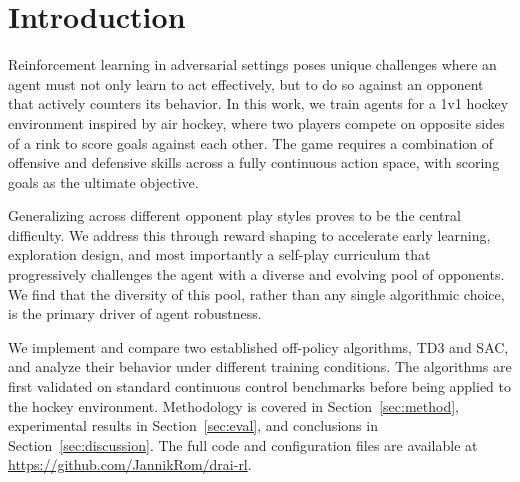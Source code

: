 \section{Introduction}\label{sec:intro}

Reinforcement learning in adversarial settings poses unique challenges where an agent 
must not only learn to act effectively, but to do so against an opponent that actively 
counters its behavior. In this work, we train agents for a 1v1 hockey environment 
inspired by air hockey, where two players compete on opposite sides of a rink to 
score goals against each other. The game requires a combination of offensive and 
defensive skills across a fully continuous action space, with scoring goals as 
the ultimate objective.

\medskip
Generalizing across different opponent play styles proves to be the central difficulty. 
We address this through reward shaping to accelerate early learning, exploration 
design, and most importantly a self-play curriculum that progressively challenges the 
agent with a diverse and evolving pool of opponents. We find that the diversity of 
this pool, rather than any single algorithmic choice, is the primary driver of 
agent robustness.

\medskip
We implement and compare two established off-policy algorithms, \ac{TD3} and \ac{SAC}, 
and analyze their behavior under different training conditions. The algorithms are first 
validated on standard continuous control benchmarks before being applied to the hockey 
environment. Methodology is covered in Section~\ref{sec:method}, experimental results 
in Section~\ref{sec:eval}, and conclusions in Section~\ref{sec:discussion}. 
The full code and configuration files are available at 
\url{https://github.com/JannikRom/drai-rl}.